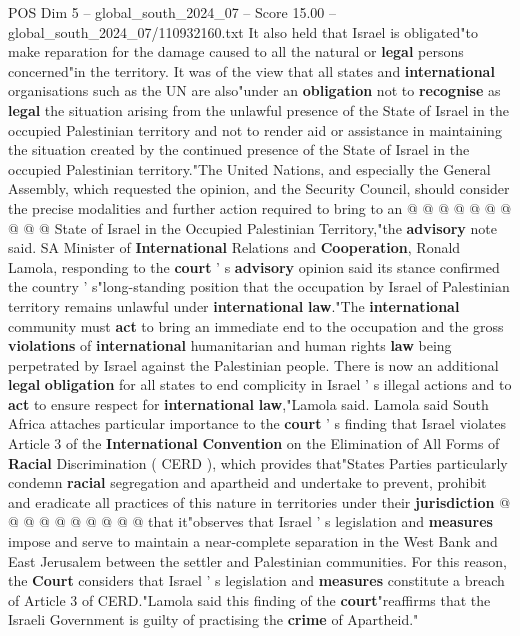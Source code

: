 \begin{textsample}{POS Dim 5 – global\_south\_2024\_07 – Score 15.00 – global\_south\_2024\_07/110932160.txt}
It also held that Israel is obligated"to make reparation for the damage caused to all the natural or \textbf{legal} persons concerned"in the territory.
It was of the view that all states and \textbf{international} organisations such as the UN are also"under an \textbf{obligation} not to \textbf{recognise} as \textbf{legal} the situation arising from the unlawful presence of the State of Israel in the occupied Palestinian territory and not to render aid or assistance in maintaining the situation created by the continued presence of the State of Israel in the occupied Palestinian territory."The United Nations, and especially the General Assembly, which requested the opinion, and the Security Council, should consider the precise modalities and further action required to bring to an @ @ @ @ @ @ @ @ @ @ State of Israel in the Occupied Palestinian Territory,"the \textbf{advisory} note said.
SA Minister of \textbf{International} Relations and \textbf{Cooperation}, Ronald Lamola, responding to the \textbf{court} ' s \textbf{advisory} opinion said its stance confirmed the country ' s"long-standing position that the occupation by Israel of Palestinian territory remains unlawful under \textbf{international} \textbf{law}."The \textbf{international} community must \textbf{act} to bring an immediate end to the occupation and the gross \textbf{violations} of \textbf{international} humanitarian and human rights \textbf{law} being perpetrated by Israel against the Palestinian people.
There is now an additional \textbf{legal} \textbf{obligation} for all states to end complicity in Israel ' s illegal actions and to \textbf{act} to ensure respect for \textbf{international} \textbf{law},"Lamola said.
Lamola said South Africa attaches particular importance to the \textbf{court} ' s finding that Israel violates Article 3 of the \textbf{International} \textbf{Convention} on the Elimination of All Forms of \textbf{Racial} Discrimination ( CERD ), which provides that"States Parties particularly condemn \textbf{racial} segregation and apartheid and undertake to prevent, prohibit and eradicate all practices of this nature in territories under their \textbf{jurisdiction} @ @ @ @ @ @ @ @ @ @ that it"observes that Israel ' s legislation and \textbf{measures} impose and serve to maintain a near-complete separation in the West Bank and East Jerusalem between the settler and Palestinian communities.
For this reason, the \textbf{Court} considers that Israel ' s legislation and \textbf{measures} constitute a breach of Article 3 of CERD."Lamola said this finding of the \textbf{court}"reaffirms that the Israeli Government is guilty of practising the \textbf{crime} of Apartheid."

\end{textsample}
